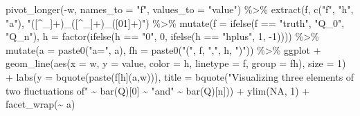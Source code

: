 \documentclass[
  11pt,
  openright,twoside]{book}
\newenvironment{Shaded}{\begin{snugshade}}{\end{snugshade}}
\newcommand{\AttributeTok}[1]{\textcolor[rgb]{0.77,0.63,0.00}{#1}}
\newcommand{\ConstantTok}[1]{\textcolor[rgb]{0.00,0.00,0.00}{#1}}
\newcommand{\DecValTok}[1]{\textcolor[rgb]{0.00,0.00,0.81}{#1}}
\newcommand{\FunctionTok}[1]{\textcolor[rgb]{0.00,0.00,0.00}{#1}}
\newcommand{\NormalTok}[1]{#1}
\newcommand{\SpecialCharTok}[1]{\textcolor[rgb]{0.00,0.00,0.00}{#1}}
\newcommand{\StringTok}[1]{\textcolor[rgb]{0.31,0.60,0.02}{#1}}
\theoremstyle{definition}
\theoremstyle{definition}
\theoremstyle{definition}
\theoremstyle{definition}
\theoremstyle{remark}
\begin{document}
\begin{Shaded}
\begin{Highlighting}[]
  \FunctionTok{pivot\_longer}\NormalTok{(}\SpecialCharTok{{-}}\NormalTok{w, }\AttributeTok{names\_to =} \StringTok{"f"}\NormalTok{, }\AttributeTok{values\_to =} \StringTok{"value"}\NormalTok{) }\SpecialCharTok{\%\textgreater{}\%}
  \FunctionTok{extract}\NormalTok{(f, }\FunctionTok{c}\NormalTok{(}\StringTok{"f"}\NormalTok{, }\StringTok{"h"}\NormalTok{, }\StringTok{"a"}\NormalTok{), }\StringTok{"([\^{}\_]+)\_([\^{}\_]+)\_([01]+)"}\NormalTok{) }\SpecialCharTok{\%\textgreater{}\%}
  \FunctionTok{mutate}\NormalTok{(}\AttributeTok{f =} \FunctionTok{ifelse}\NormalTok{(f }\SpecialCharTok{==} \StringTok{"truth"}\NormalTok{, }\StringTok{"Q\_0"}\NormalTok{, }\StringTok{"Q\_n"}\NormalTok{),}
         \AttributeTok{h =} \FunctionTok{factor}\NormalTok{(}\FunctionTok{ifelse}\NormalTok{(h }\SpecialCharTok{==} \StringTok{"0"}\NormalTok{, }\DecValTok{0}\NormalTok{, }\FunctionTok{ifelse}\NormalTok{(h }\SpecialCharTok{==} \StringTok{"hplus"}\NormalTok{, }\DecValTok{1}\NormalTok{, }\SpecialCharTok{{-}}\DecValTok{1}\NormalTok{)))) }\SpecialCharTok{\%\textgreater{}\%}
  \FunctionTok{mutate}\NormalTok{(}\AttributeTok{a =} \FunctionTok{paste0}\NormalTok{(}\StringTok{"a="}\NormalTok{, a),}
         \AttributeTok{fh =} \FunctionTok{paste0}\NormalTok{(}\StringTok{"("}\NormalTok{, f, }\StringTok{","}\NormalTok{, h, }\StringTok{")"}\NormalTok{)) }\SpecialCharTok{\%\textgreater{}\%}
\NormalTok{  ggplot }\SpecialCharTok{+}
  \FunctionTok{geom\_line}\NormalTok{(}\FunctionTok{aes}\NormalTok{(}\AttributeTok{x =}\NormalTok{ w, }\AttributeTok{y =}\NormalTok{ value, }\AttributeTok{color =}\NormalTok{ h, }\AttributeTok{linetype =}\NormalTok{ f, }\AttributeTok{group =}\NormalTok{ fh),}
            \AttributeTok{size =} \DecValTok{1}\NormalTok{) }\SpecialCharTok{+}
  \FunctionTok{labs}\NormalTok{(}\AttributeTok{y =} \FunctionTok{bquote}\NormalTok{(}\FunctionTok{paste}\NormalTok{(f[h](a,w))),}
       \AttributeTok{title =} \FunctionTok{bquote}\NormalTok{(}\StringTok{"Visualizing three elements of two fluctuations of"}
                      \SpecialCharTok{\textasciitilde{}} \FunctionTok{bar}\NormalTok{(Q)[}\DecValTok{0}\NormalTok{] }\SpecialCharTok{\textasciitilde{}} \StringTok{"and"} \SpecialCharTok{\textasciitilde{}} \FunctionTok{bar}\NormalTok{(Q)[n])) }\SpecialCharTok{+}
  \FunctionTok{ylim}\NormalTok{(}\ConstantTok{NA}\NormalTok{, }\DecValTok{1}\NormalTok{) }\SpecialCharTok{+}
  \FunctionTok{facet\_wrap}\NormalTok{(}\SpecialCharTok{\textasciitilde{}}\NormalTok{ a)}
\end{Highlighting}
\end{Shaded}
\end{document}

